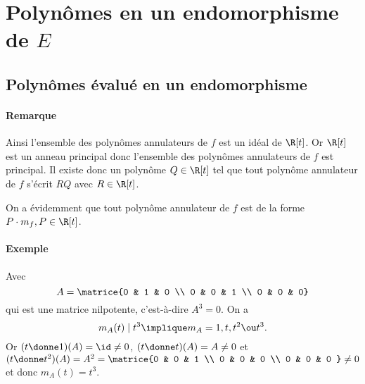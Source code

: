 \documentclass{mybourbaki}
\begin{document}
\section{Polynômes en un endomorphisme de $E$}

\subsection{Polynômes évalué en un endomorphisme}


\paragraph{Remarque}Ainsi l'ensemble des polynômes annulateurs de $f$ est un idéal de $\R[t]$. Or $\R[t]$ est un anneau principal donc l'ensemble des polynômes annulateurs de $f$ est principal. Il existe donc un polynôme $Q\in \R[t]$ tel que tout polynôme annulateur de $f$ s'écrit $RQ$ avec $R\in \R[t]$.

On a évidemment que tout polynôme annulateur de $f$ est de la forme $P\cdot m_f, P \in \R[t]$.

\paragraph{Exemple}Avec \[A = \matrice{0 & 1 & 0 \\ 0 & 0 & 1 \\ 0 & 0 & 0} \] qui est une matrice nilpotente, c'est-à-dire $A^{3} = 0$. On a \[m_A(t) \mid t^{3} \implique m_A = 1,t,t^{2} \ou t^{3}.\] Or $(t\donne 1)(A) = \id \neq 0$, $(t\donne t)(A) = A \neq 0$ et $(t\donne t^{2})(A) = A^{2} = \matrice{0 & 0 & 1 \\ 0 & 0 & 0 \\ 0 & 0 & 0 }\neq 0$ et donc $m_A(t) = t^{3}$. 
\end{document}
